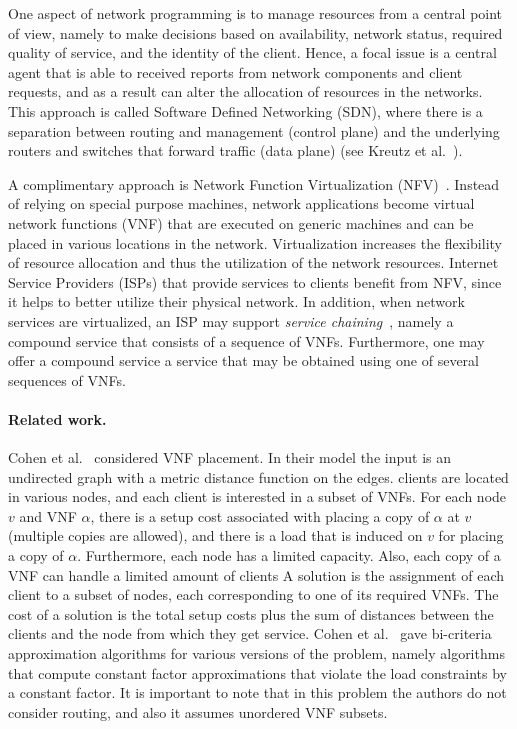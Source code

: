 \documentclass[runningheads]{llncs}
\begin{document}
One aspect of network programming is to manage resources from a
central point of view, namely to make decisions based on availability,
network status, required quality of service, and the identity of the
client.  Hence, a focal issue is a central agent that is able to
received reports from network components and client requests, and as a
result can alter the allocation of resources in the networks.  This
approach is called Software Defined Networking (SDN), where there is a
separation between routing and management (control plane) and the
underlying routers and switches that forward traffic (data plane) (see
Kreutz et al.~\cite{KRVRAU15}).

A complimentary approach is Network Function Virtualization
(NFV)~\cite{NFV12}.  Instead of relying on special purpose machines,
network applications become virtual network functions (VNF) that are
executed on generic machines and can be placed in various locations in
the network.  Virtualization increases the flexibility of resource
allocation and thus the utilization of the network resources.
%
Internet Service Providers (ISPs) that provide services to clients
benefit from NFV, since it helps to better utilize their physical
network.  In addition, when network services are virtualized, an ISP
may support \emph{service chaining}~\cite{ServiceChaining15}, namely a
compound service that consists of a sequence of VNFs.  Furthermore,
one may offer a compound service a service that may be obtained using
one of several sequences of VNFs.





\paragraph*{\bf Related work.}
%

Cohen et al.~\cite{CLNR15} considered VNF placement.  In their model
the input is an undirected graph with a metric distance function on
the edges.  clients are located in various nodes, and each client is
interested in a subset of VNFs.  For each node $v$ and VNF $\alpha$,
there is a setup cost associated with placing a copy of $\alpha$ at
$v$ (multiple copies are allowed), and there is a load that is induced
on $v$ for placing a copy of $\alpha$.  Furthermore, each node has a
limited capacity.  Also, each copy of a VNF can handle a limited
amount of clients A solution is the assignment of each client to a
subset of nodes, each corresponding to one of its required VNFs.  The
cost of a solution is the total setup costs plus the sum of distances
between the clients and the node from which they get service.
%
Cohen et al.~\cite{CLNR15} gave bi-criteria approximation algorithms
for various versions of the problem, namely algorithms that compute
constant factor approximations that violate the load constraints by a
constant factor.
%
It is important to note that in this problem the authors do not consider
routing, and also it assumes unordered VNF subsets.
\end{document}
